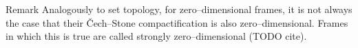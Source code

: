 \begin{blockProp}{Remark}
    Analogously to set topology, for zero--dimensional frames, it is not always the case that their Čech--Stone compactification is also zero--dimensional. Frames in which this is true are called strongly zero--dimensional (TODO cite).
\end{blockProp}


